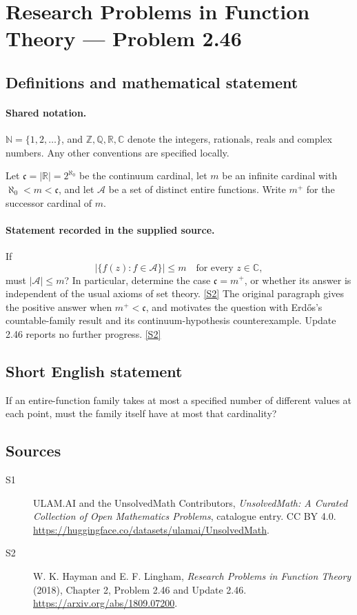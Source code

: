 \documentclass[11pt]{article}
\newcommand{\sref}[2]{\hyperlink{source:#1:#2}{[S#2]}}
\begin{document}
\section{Research Problems in Function Theory — Problem 2.46}\label{statement}

\subsection{Definitions and mathematical statement}

\paragraph{Shared notation.}$\mathbb N=\{1,2,\ldots\}$, and $\mathbb Z,\mathbb Q,\mathbb R,\mathbb C$ denote the integers, rationals, reals and complex numbers. Any other conventions are specified locally.


Let $\mathfrak c=|\mathbb R|=2^{\aleph_0}$ be the continuum cardinal, let $m$ be an infinite cardinal with $\aleph_0<m<\mathfrak c$, and let $\mathcal A$ be a set of distinct entire functions. Write $m^+$ for the successor cardinal of $m$.

\paragraph{Statement recorded in the supplied source.}
If
\[\bigl|\{f(z):f\in\mathcal A\}\bigr|\le m\quad\text{for every }z\in\mathbb C,\]
must $|\mathcal A|\le m$? In particular, determine the case $\mathfrak c=m^+$, or whether its answer is independent of the usual axioms of set theory. \sref{statement}{2}
The original paragraph gives the positive answer when $m^+<\mathfrak c$, and motivates the question with Erdős's countable-family result and its continuum-hypothesis counterexample. Update 2.46 reports no further progress. \sref{statement}{2}
\subsection{Short English statement}
If an entire-function family takes at most a specified number of different values at each point, must the family itself have at most that cardinality?
\subsection{Sources}
\begin{description}
\item[\hypertarget{source:statement:1}{S1}] ULAM.AI and the UnsolvedMath Contributors, \emph{UnsolvedMath: A Curated Collection of Open Mathematics Problems}, catalogue entry. CC BY 4.0. \url{https://huggingface.co/datasets/ulamai/UnsolvedMath}.
\item[\hypertarget{source:statement:2}{S2}] W. K. Hayman and E. F. Lingham, \emph{Research Problems in Function Theory} (2018), Chapter 2, Problem 2.46 and Update 2.46. \url{https://arxiv.org/abs/1809.07200}.
\end{description}
\label{end:statement}
\end{document}
